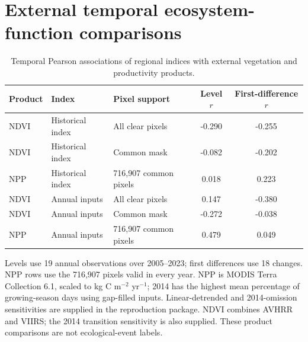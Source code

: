\documentclass[preprint,11pt,authoryear]{elsarticle}
\begin{document}
\section{External temporal ecosystem-function comparisons}
\label{app:annual-proxies}
\begin{table}[htbp]
\centering
\caption{Temporal Pearson associations of regional indices with external vegetation and productivity products.}
\label{tab:annual-proxies}
\footnotesize
\begin{tabular}{lllcc}
\toprule
Product & Index & Pixel support & Level $r$ & First-difference $r$ \\
\midrule
NDVI & Historical index & All clear pixels & -0.290 & -0.255 \\
NDVI & Historical index & Common mask & -0.082 & -0.202 \\
NPP & Historical index & 716,907 common pixels & 0.018 & 0.223 \\
NDVI & Annual inputs & All clear pixels & 0.147 & -0.380 \\
NDVI & Annual inputs & Common mask & -0.272 & -0.038 \\
NPP & Annual inputs & 716,907 common pixels & 0.479 & 0.049 \\
\bottomrule
\end{tabular}

\vspace{2pt}
{\scriptsize Levels use 19 annual observations over 2005--2023; first differences use 18 changes. NPP rows use the 716,907 pixels valid in every year. NPP is MODIS Terra Collection 6.1, scaled to kg C m$^{-2}$ yr$^{-1}$; 2014 has the highest mean percentage of growing-season days using gap-filled inputs. Linear-detrended and 2014-omission sensitivities are supplied in the reproduction package. NDVI combines AVHRR and VIIRS; the 2014 transition sensitivity is also supplied. These product comparisons are not ecological-event labels.}
\end{table}
\end{document}
